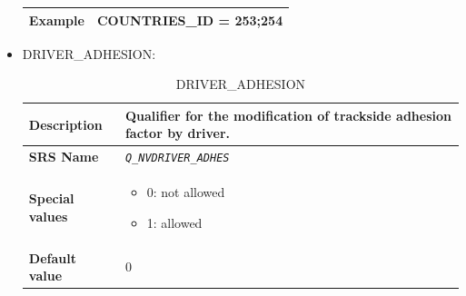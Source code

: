 \documentclass{template/openetcs}
\begin{document}
\begin{itemize}
\begin{longtable}{|l|l|}
				\hline
				
					\begin{minipage}[t]{0.22\linewidth} \textbf{Example}	\end{minipage} 
				&	\begin{minipage}[t]{0.78\linewidth} COUNTRIES\_ID = 253;254 \end{minipage} \\
				
				\hline
				
			\end{longtable}			
			
		\item DRIVER\_ADHESION:
		
			\begin{longtable}{|l|l|}
				\caption{DRIVER\_ADHESION}\\ 	
				\hline
				
					\begin{minipage}[t]{0.22\linewidth} \textbf{Description}	\end{minipage} 
				&	\begin{minipage}[t]{0.78\linewidth} Qualifier for the modification of trackside adhesion factor by driver. \end{minipage} \\
				
				\hline
				
					\begin{minipage}[t]{0.22\linewidth} \textbf{SRS Name}	\end{minipage} 
				&	\begin{minipage}[t]{0.78\linewidth} \emph{\texttt{Q\_NVDRIVER\_ADHES}} \end{minipage} \\
				
				\hline
														
					\begin{minipage}[t]{0.22\linewidth} \textbf{Special values}	\end{minipage} 
				&	\begin{minipage}[t]{0.78\linewidth} \begin{itemize} \item 0: not allowed \item 1: allowed \end{itemize} \end{minipage} \\
				
				\hline
										
					\begin{minipage}[t]{0.22\linewidth} \textbf{Default value}	\end{minipage} 
				&	\begin{minipage}[t]{0.78\linewidth} 0 \end{minipage} \\
				

\end{longtable}
\end{itemize}
\end{document}
